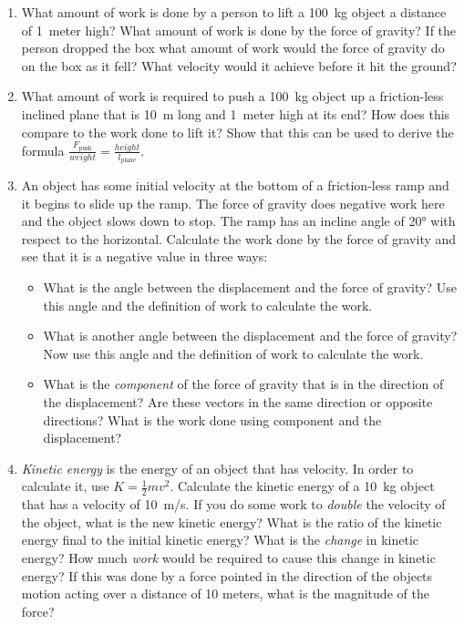 \begin{enumerate}
\item
What amount of work is done by a person to lift a \SI{100}{kg} object a distance of \SI{1}{meter} high? What amount of work is done by the force of gravity? If the person dropped the box what amount of work would the force of gravity do on the box as it fell? What velocity would it achieve before it hit the ground?

\item What amount of work is required to push a \SI{100}{kg} object up a friction-less inclined plane that is \SI{10}{\meter} long and \SI{1}{meter} high at its end? How does this compare to the work done to lift it? Show that this can be used to derive the formula $\frac{F_{\mathrm{push}}}{\mathit{weight}}=\frac{\mathit{height}}{l_{\mathrm{plane}}}$.\bigskip

\item An object has some initial velocity at the bottom of a friction-less ramp and it begins to slide up the ramp. The force of gravity does negative work here and the object slows down to stop. The ramp has an incline angle of \ang{20} with respect to the horizontal. Calculate the work done by the force of gravity and see that it is a negative value in three ways:
\begin{itemize}
	\setlength\itemsep{1 in}
	\item What is the angle between the displacement and the force of gravity? Use this angle and the definition of work to calculate the work.
	\item What is another angle between the displacement and the force of gravity? Now use this angle and the definition of work to calculate the work.
	\item What is the \emph{component} of the force of gravity that is in the direction of the displacement? Are these vectors in the same direction or opposite directions? What is the work done using component and the displacement? 
\end{itemize}

\item 
\emph{Kinetic energy} is the energy of an object that has velocity. In order to calculate it, use $K = \frac{1}{2}mv^2$. Calculate the kinetic energy of a \SI{10}{kg} object that has a velocity of \SI{10}{m/s}. If you do some work to \emph{double} the velocity of the object, what is the new kinetic energy? What is the ratio of the kinetic energy final to the initial kinetic energy? What is the \emph{change} in kinetic energy? How much \emph{work} would be required to cause this change in kinetic energy? If this was done by a force pointed in the direction of the objects motion acting over a distance of 10 meters, what is the magnitude of the force?\hugeskip


\end{enumerate}
